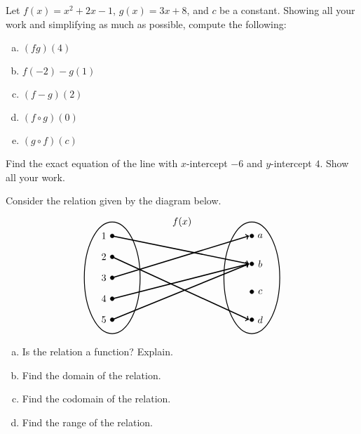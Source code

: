 \documentclass[11pt,letterpaper]{article}
\begin{document}
\prob Let $f(x)= x^2 + 2x - 1$, $g(x)= 3x + 8$, and $c$ be a constant. Showing all your work and simplifying as much as possible, compute the following:
	\begin{enumerate}[(a)]
	\item $(fg)(4)$
	\item $f(-2) - g(1)$
	\item $(f - g)(2)$
	\item $(f \circ g)(0)$
	\item $(g \circ f)(c)$
	\end{enumerate} \pspace


\prob Find the exact equation of the line with $x$-intercept $-6$ and $y$-intercept $4$. Show all your work. \pspace


\prob Consider the relation given by the diagram below.
	\[
	\begin{tikzpicture}
	\node at (2.5,2) {$f(x)$};
	
	\draw[line width=0.03cm] (0,0) circle (1 and 2);
	\draw[line width=0.03cm] (5,0) circle (1 and 2);
	
	\draw[fill=black] (0,1.5) circle (0.07);
	\draw[fill=black] (0,0.75) circle (0.07);
	\draw[fill=black] (0,0) circle (0.07);
	\draw[fill=black] (0,-0.75) circle (0.07);
	\draw[fill=black] (0,-1.5) circle (0.07);
	
	\draw[fill=black] (5,1.5) circle (0.07);
	\draw[fill=black] (5,0.50) circle (0.07);
	\draw[fill=black] (5,-0.5) circle (0.07);
	\draw[fill=black] (5,-1.5) circle (0.07);
	
	\draw[line width=0.04cm,->] (0,1.5) -- (4.9,0.50);
	\draw[line width=0.04cm,->] (0,0.75) -- (4.9,-1.5);
	\draw[line width=0.04cm,->] (0,0) -- (4.9,1.5);
	\draw[line width=0.04cm,->] (0,-1.5) -- (4.9,0.5);
	\draw[line width= 0.04cm,->,black] (0,-0.75) -- (4.9,0.5);
	
	\node at (-0.3,1.5) {$1$};
	\node at (-0.3,0.75) {$2$};
	\node at (-0.3,0) {$3$};
	\node at (-0.3,-0.75) {$4$};
	\node at (-0.3,-1.5) {$5$};
	
	\node at (5.3,1.5) {$a$};
	\node at (5.3,0.5) {$b$};
	\node at (5.3,-0.5) {$c$};
	\node at (5.3,-1.5) {$d$};
	\end{tikzpicture}
	\]

\begin{enumerate}[(a)]
\item Is the relation a function? Explain. 
\item Find the domain of the relation.
\item Find the codomain of the relation.
\item Find the range of the relation. 
\end{enumerate}  \pspace
\end{document}
